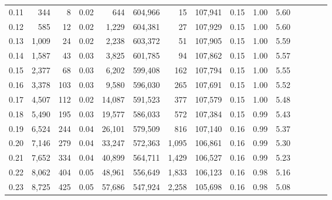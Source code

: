 \begin{tabular}{rrrcrrrrrrrrrrr}
0.11 &     344 &      8 &                                       0.02 &      644 &  604,966 &       15 &  107,941 &  0.15 &  1.00 &                         5.60 \\
0.12 &     585 &     12 &                                       0.02 &    1,229 &  604,381 &       27 &  107,929 &  0.15 &  1.00 &                         5.60 \\
0.13 &   1,009 &     24 &                                       0.02 &    2,238 &  603,372 &       51 &  107,905 &  0.15 &  1.00 &                         5.59 \\
0.14 &   1,587 &     43 &                                       0.03 &    3,825 &  601,785 &       94 &  107,862 &  0.15 &  1.00 &                         5.57 \\
0.15 &   2,377 &     68 &                                       0.03 &    6,202 &  599,408 &      162 &  107,794 &  0.15 &  1.00 &                         5.55 \\
0.16 &   3,378 &    103 &                                       0.03 &    9,580 &  596,030 &      265 &  107,691 &  0.15 &  1.00 &                         5.52 \\
0.17 &   4,507 &    112 &                                       0.02 &   14,087 &  591,523 &      377 &  107,579 &  0.15 &  1.00 &                         5.48 \\
0.18 &   5,490 &    195 &                                       0.03 &   19,577 &  586,033 &      572 &  107,384 &  0.15 &  0.99 &                         5.43 \\
0.19 &   6,524 &    244 &                                       0.04 &   26,101 &  579,509 &      816 &  107,140 &  0.16 &  0.99 &                         5.37 \\
0.20 &   7,146 &    279 &                                       0.04 &   33,247 &  572,363 &    1,095 &  106,861 &  0.16 &  0.99 &                         5.30 \\
0.21 &   7,652 &    334 &                                       0.04 &   40,899 &  564,711 &    1,429 &  106,527 &  0.16 &  0.99 &                         5.23 \\
0.22 &   8,062 &    404 &                                       0.05 &   48,961 &  556,649 &    1,833 &  106,123 &  0.16 &  0.98 &                         5.16 \\
0.23 &   8,725 &    425 &                                       0.05 &   57,686 &  547,924 &    2,258 &  105,698 &  0.16 &  0.98 &                         5.08 \\

\end{tabular}

